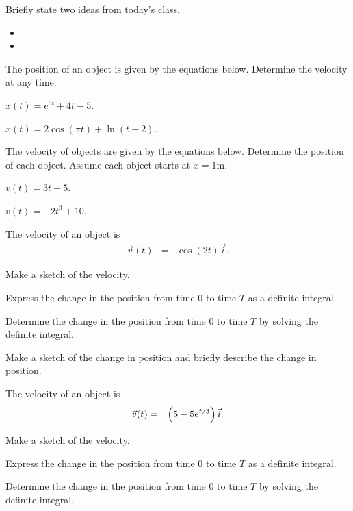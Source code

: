 \begin{problem}
\item Briefly state two ideas from today's class.
  \begin{itemize}
  \item 
  \item 
  \end{itemize}
\item The position of an object is given by the equations
  below. Determine the velocity at any time.
  \begin{subproblem}
  \item $x(t) = e^{3t} + 4t  - 5$.
    \vfill
  \item $x(t) = 2\cos(\pi t) + \ln(t+2)$.
    \vfill
  \end{subproblem}
\item The velocity of objects are given by the equations
  below. Determine the position of each object. Assume each object
  starts at $x=1$m.
  \begin{subproblem}
  \item $v(t) = 3t - 5$.
    \vfill
  \item $v(t) = -2 t^3 + 10$.
    \vfill
  \end{subproblem}
\clearpage
\item The velocity of an object is 
  \begin{eqnarray*}
    \vec{v}(t) & = & \cos(2t) \vec{i}.
  \end{eqnarray*}
  \begin{subproblem}
  \item Make a sketch of the velocity.  
    \vfill
  \item Express the change in the position from time 0 to time $T$ as
    a definite integral.  
    \vfill
  \item Determine the change in the position from time 0 to time $T$
    by solving the definite integral.
    \vfill
  \item Make a sketch of the change in position and briefly describe
    the change in position.
    \vfill
  \end{subproblem}
  \clearpage

\item The velocity of an object is 
  \begin{eqnarray*}
    \vec{v}(t) & = & \left( 5 - 5 e^{t/3} \right) \vec{i}.
  \end{eqnarray*}
  \begin{subproblem}
  \item Make a sketch of the velocity.  
    \vfill
  \item Express the change in the position from time 0 to time $T$ as
    a definite integral.  
    \vfill
  \item Determine the change in the position from time 0 to time $T$
    by solving the definite integral.  
    \vfill
  \end{subproblem}
\end{problem}


